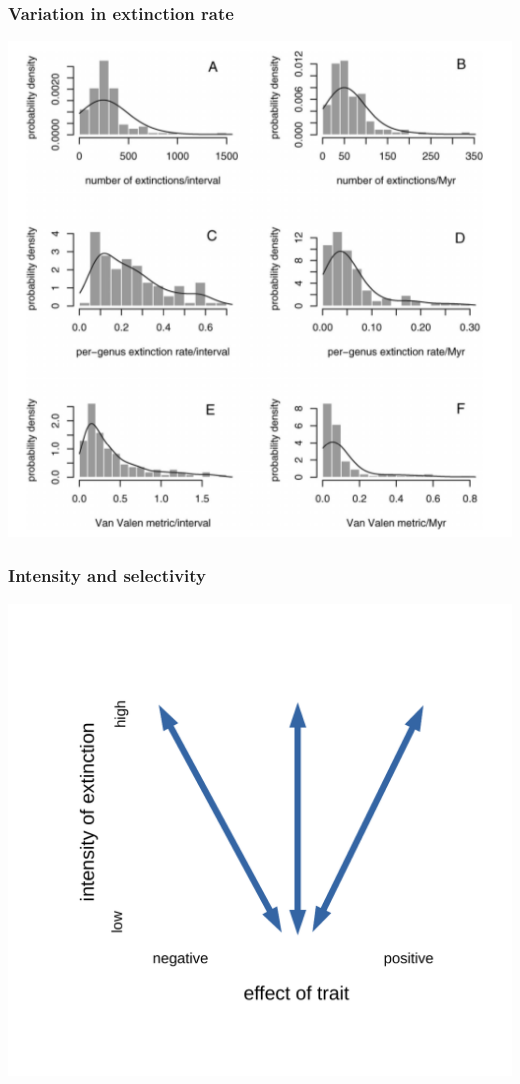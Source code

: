 \documentclass{beamer}
\begin{document}
\begin{frame}
  \frametitle{Variation in extinction rate}
  \begin{center}
    \includegraphics[width = \textwidth,height = 0.8\textheight,keepaspectratio = true]{figure/wang_extinction}
  \end{center}

  \footnotesize{}
\end{frame}

\begin{frame}
  \frametitle{Intensity and selectivity}
  \begin{center}
    \includegraphics[width = \textwidth,height = 0.8\textheight,keepaspectratio = true]{figure/intensity_selectivity_base}
  \end{center}
\end{frame}
\end{document}
